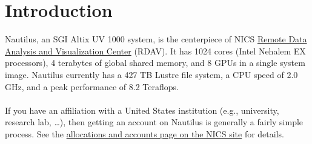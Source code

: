 \section{Introduction}


Nautilus, an SGI Altix UV 1000 system, is the centerpiece of NICS \href{http://rdav.nics.tennessee.edu/}{Remote Data Analysis and Visualization Center} (RDAV). It has 1024 cores (Intel Nehalem EX processors), 4 terabytes of global shared memory, and 8 GPUs in a single system image. Nautilus currently has a 427 TB Lustre file system, a CPU speed of 2.0 GHz, and a peak performance of 8.2 Teraflops.\\\\


\label{getacct}
If you have an affiliation with a United States institution (e.g., university, research lab, \dots), then getting an account on Nautilus is generally a fairly simple process.  See the \href{http://www.nics.tennessee.edu/getting-started/accounts}{allocations and accounts page on the NICS site} for details.